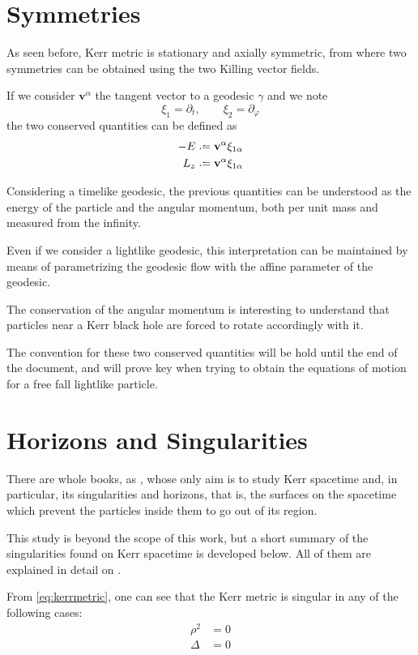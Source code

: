 \section{Symmetries}

As seen before, Kerr metric is stationary and axially symmetric, from where two symmetries can be obtained using the two Killing vector fields.

If we consider $\mathbf{v}^\alpha$ the tangent vector to a geodesic $\gamma$ and we note
\[
	\xi_1 = \partial_t, \qquad \xi_2 = \partial_\varphi
\]
the two conserved quantities can be defined as
\begin{align}
	-E &\defeq \mathbf{v}^\alpha \xi_{1\alpha} \\
	L_z &\defeq \mathbf{v}^\alpha \xi_{1\alpha}
\end{align}

Considering a timelike geodesic, the previous quantities can be understood as the energy of the particle and the angular momentum, both per unit mass and measured from the infinity.

Even if we consider a lightlike geodesic, this interpretation can be maintained by means of parametrizing the geodesic flow with the affine parameter of the geodesic.

The conservation of the angular momentum is interesting to understand that particles near a Kerr black hole are forced to rotate accordingly with it.

The convention for these two conserved quantities will be hold until the end of the document, and will prove key when trying to obtain the equations of motion for a free fall lightlike particle.


\section{Horizons and Singularities}

There are whole books, as \cite{oneill95}, whose only aim is to study Kerr spacetime and, in particular, its singularities and horizons, that is, the surfaces on the spacetime which prevent the particles inside them to go out of its region.

This study is beyond the scope of this work, but a short summary of the singularities found on Kerr spacetime is developed below. All of them are explained in detail on \cite[Sec. 2.4]{galindo14}.

From \autoref{eq:kerrmetric}, one can see that the Kerr metric is singular in any of the following cases:
\begin{align}
	\rho^2 &= 0 \\
	\Delta &= 0
\end{align}


